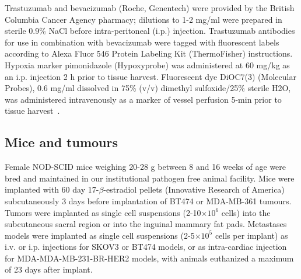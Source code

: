 Trastuzumab and bevacizumab (Roche, Genentech) were provided by the British Columbia Cancer Agency pharmacy; dilutions to 1-2 mg/ml were prepared in sterile 0.9\% NaCl before intra-peritoneal (\acs{i.p.}) injection.
Trastuzumab antibodies for use in combination with bevacizumab were tagged with fluorescent labels according to Alexa Fluor 546 Protein Labeling Kit (ThermoFisher) instructions.
Hypoxia marker pimonidazole (Hypoxyprobe) was administered at 60 mg/kg as an \acs{i.p.} injection 2 h prior to tissue harvest.
Fluorescent dye DiOC7(3) (Molecular Probes), 0.6 mg/ml dissolved in 75\% (v/v) dimethyl sulfoxide/25\% sterile H2O, was administered intravenously as a marker of vessel perfusion 5-min prior to tissue harvest~\cite{Trotter:1989cs}.

\subsection{Mice and tumours}

Female NOD-SCID mice weighing 20-28 g between 8 and 16 weeks of age were bred and maintained in our institutional pathogen free animal facility.
Mice were implanted with 60 day 17-$\beta$-estradiol pellets (Innovative Research of America) subcutaneously 3 days before implantation of \acs{BT474} or \acs{MDA-MB-361} tumours.
Tumors were implanted as single cell suspensions (2-10$\times 10^6$ cells) into the subcutaneous sacral region or into the inguinal mammary fat pads.
Metastases models were implanted as single cell suspensions (2-5$\times 10^5$ cells per implant) as \acs{i.v.} or \acs{i.p.} injections for SKOV3 or \acs{BT474} models, or as intra-cardiac injection for MDA-MDA-MB-231-BR-\acs{HER2} models, with animals euthanized a maximum of 23 days after implant.

